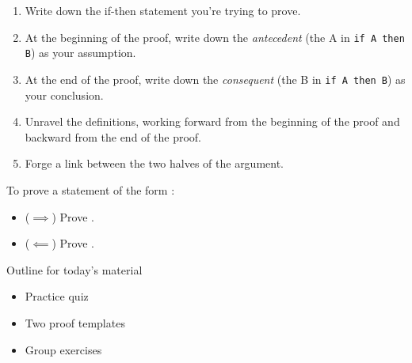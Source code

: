 \documentclass[10pt]{beamer}
\begin{document}
\begin{frame}

\begin{mybluebox}[title=Proof Template 1: Direct proof of an if-then theorem]

\begin{enumerate}
	\item Write down the if-then statement you're trying to prove. \pause  
	\item At the beginning of the proof, write down the \textit{antecedent} (the A in  \texttt{if A then B}) as your assumption. \pause 
	\item  At the end of the proof, write down the \textit{consequent} (the B in  \texttt{if A then B}) as your conclusion. \pause 
	\item Unravel the definitions, working forward from the beginning of the proof and backward from the end of the proof. \pause 
	\item Forge a link between the two halves of the argument.
\end{enumerate}
	
\end{mybluebox}
	
\end{frame}


\begin{frame}

\begin{mybluebox}[title=Proof Template 2: Direct proof of an if-and-only-if theorem]

To prove a statement of the form :
\begin{itemize}
\item ($\implies$) Prove .
\item ($\impliedby$) Prove .
\end{itemize}

	
\end{mybluebox}
	
\end{frame}


\begin{frame}[standout]
Outline for today's material
\begin{itemize}
\item \textbullet \quad Practice quiz
\item \textbullet \quad Two proof templates
\item \textbullet \quad \alert{Group exercises}
\end{itemize}

\end{frame}
\end{document}
